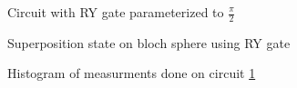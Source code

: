 \begin{figure}[!h]
    \centering
    \caption{Circuit with RY gate parameterized to $\frac{\pi}{2}$}
    \label{fig:circuit_ry}
\end{figure}

\begin{figure}[!h]
    \centering
    \caption{Superposition state on bloch sphere using RY gate}
    \label{fig:ry_bloch_sphere}
\end{figure}

\begin{figure}[!h]
    \centering
    \caption{Histogram of measurments done on circuit \ref{fig:circuit_ry}}
    \label{fig:histogram_ry}
\end{figure}

